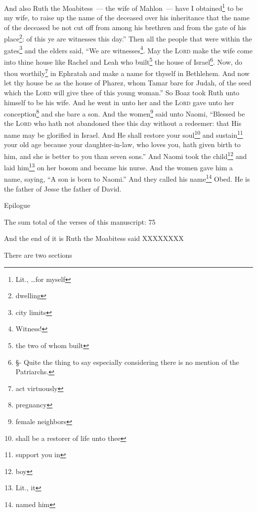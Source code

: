 \begin{enumerate}[align=center]
     And also Ruth the Moabitess~--- the wife of Mahlon~--- have I obtained\footnote{Lit., \dots for myself} to be my wife, to raise up the name of the deceased over his inheritance that the name of the deceased be not cut off from among his brethren and from the gate of his place\footnote{dwelling}: of this ye are witnesses this day.''%
     Then all the people that were within the gates\footnote{city limits} and the elders said, ``We are witnesses\footnote{Witness!}. May the \textsc{Lord} make the wife come into thine house like Rachel and Leah who built\footnote{the two of whom built} the house of Israel\footnote{\S - Quite the thing to say especially considering there is no mention of the Patriarchs.}. Now, do thou worthily\footnote{act virtuously} in Ephratah and make a name for thyself in Bethlehem.%
     And now let thy house be as the house of Pharez, whom Tamar bare for Judah, of the seed which the \textsc{Lord} will give thee of this young woman.''%
     So Boaz took Ruth unto himself to be his wife. And he went in unto her and the \textsc{Lord} gave unto her conception\footnote{pregnancy} and she bare a son.%
     And the women\footnote{female neighbors} said unto Naomi, ``Blessed be the \textsc{Lord} who hath not abandoned thee this day without a redeemer: that His name may be glorified in Israel.%
     And He shall restore your soul\footnote{shall be a restorer of life unto thee} and sustain\footnote{support you in} your old age because your daughter-in-law, who loves you, hath given birth to him, and she is better to you than seven sons.''%
     And Naomi took the child\footnote{boy} and laid him\footnote{Lit., it} on her bosom and became his nurse.%
     And the women gave him a name, saying, ``A son is born to Naomi.'' And they called his name\footnote{named him} Obed. He is the father of Jesse the father of David.%
\end{enumerate}

Epilogue

The sum total of the verses of this manuscript: 75

And the end of it is Ruth the Moabitess said XXXXXXXX

There are two sections
